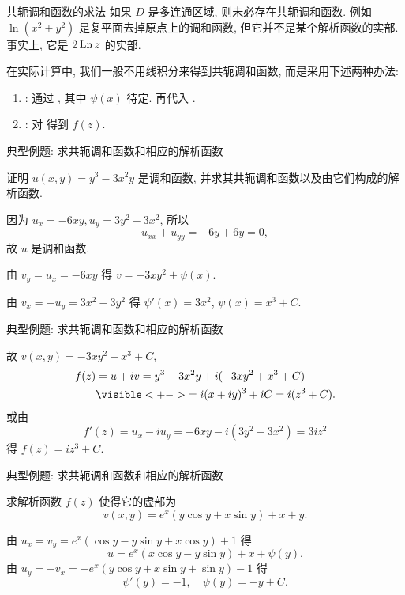 \begin{frame}{共轭调和函数的求法}
\onslide<+->
如果 $D$ 是多连通区域, 则未必存在共轭调和函数.
\onslide<+->
例如 $\ln(x^2+y^2)$ 是复平面去掉原点上的调和函数, 但它并不是某个解析函数的实部.
\onslide<+->
事实上, 它是 $2\operatorname{Ln} z$ 的实部.

\onslide<+->
在实际计算中, 我们一般不用线积分来得到共轭调和函数, 而是采用下述两种办法:
\begin{enumerate}
\item {}: 通过 , 其中 $\psi(x)$ 待定.
\onslide<+->
再代入 .
\item {}: 对 得到 $f(z)$.
\end{enumerate}
\end{frame}


\begin{frame}{典型例题: 求共轭调和函数和相应的解析函数}
\begin{example}
证明 $u(x,y)=y^3-3x^2y$ 是调和函数, 并求其共轭调和函数以及由它们构成的解析函数.
\end{example}
\begin{solution}
\indent
因为 $u_x=-6xy,u_y=3y^2-3x^2$,
\onslide<+->
所以
\[u_{xx}+u_{yy}=-6y+6y=0,\]
\onslide<+->
故 $u$ 是调和函数.

\indent
\onslide<+->
由 $v_y=u_x=-6xy$ 得 $v=-3xy^2+\psi(x)$.

\indent
\onslide<+->
由 $v_x=-u_y=3x^2-3y^2$ 得 $\psi'(x)=3x^2$,
\onslide<+->
$\psi(x)=x^3+C$.
\end{solution}
\end{frame}


\begin{frame}{典型例题: 求共轭调和函数和相应的解析函数}
\begin{solutionc}
\indent
故 $v(x,y)=-3xy^2+x^3+C$,
\onslide<+->
\begin{align*}
f(z)&=u+iv=y^3-3x^2y+i(-3xy^2+x^3+C)\\
&\visible<+->{=i(x+iy)^3+iC=i(z^3+C).}
\end{align*}
\onslide<+->
或由
\[f'(z)=u_x-iu_y=-6xy-i(3y^2-3x^2)=3iz^2\]
得 $f(z)=iz^3+C$.
\end{solutionc}
\end{frame}


\begin{frame}{典型例题: 求共轭调和函数和相应的解析函数}
\begin{example}
求解析函数 $f(z)$ 使得它的虚部为
\[v(x,y)=e^x(y\cos y+x\sin y)+x+y.\]
\end{example}
\begin{solution}
由 $u_x=v_y=e^x(\cos y-y\sin y+x\cos y)+1$ 得
\[u=e^x(x\cos y-y\sin y)+x+\psi(y).\]
\onslide<+->
由 $u_y=-v_x=-e^x(y\cos y+x\sin y+\sin y)-1$ 得
\[\psi'(y)=-1,\quad\psi(y)=-y+C.\]
\end{solution}
\end{frame}


